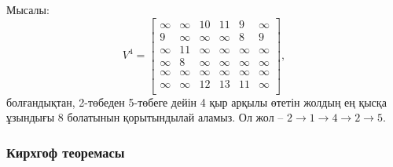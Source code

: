 Мысалы:
\[
V^4= \begin{bmatrix}
  \infty & \infty & 10 & 11 & 9 & \infty \\
  9 & \infty & \infty & \infty & 8 & 9 \\
  \infty & 11 & \infty & \infty & \infty & \infty \\
  \infty & 8 & \infty & \infty & \infty & \infty \\
  \infty & \infty & \infty & \infty & \infty & \infty \\
  \infty & \infty & 12 & 13 & 11 & \infty \\
 \end{bmatrix},
\]
болғандықтан, 2-төбеден 5-төбеге дейін 4 қыр арқылы 
өтетін жолдың ең қысқа ұзындығы 8 болатынын қорытындылай аламыз.
Ол жол --
$2 \rightarrow 1 \rightarrow 4 \rightarrow 2 \rightarrow 5$.

\subsubsection{Кирхгоф теоремасы}


